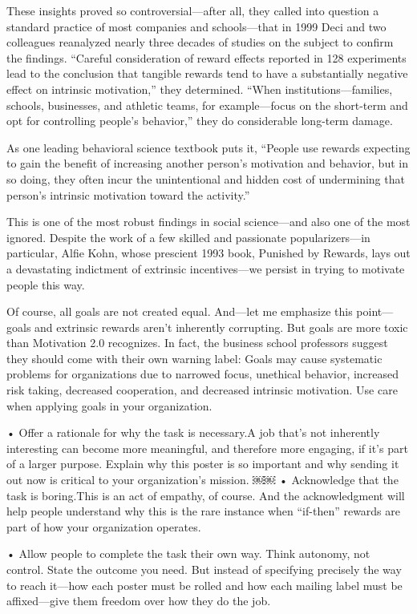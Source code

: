 These insights proved so controversial—after all, they called into question a standard practice of most companies and schools—that in 1999 Deci and two colleagues reanalyzed nearly three decades of studies on the subject to confirm the findings. “Careful consideration of reward effects reported in 128 experiments lead to the conclusion that tangible rewards tend to have a substantially negative effect on intrinsic motivation,” they determined. “When institutions—families, schools, businesses, and athletic teams, for example—focus on the short-term and opt for controlling people’s behavior,” they do considerable long-term damage.

As one leading behavioral science textbook puts it, “People use rewards expecting to gain the benefit of increasing another person’s motivation and behavior, but in so doing, they often incur the unintentional and hidden cost of undermining that person’s intrinsic motivation toward the activity.”

This is one of the most robust findings in social science—and also one of the most ignored. Despite the work of a few skilled and passionate popularizers—in particular, Alfie Kohn, whose prescient 1993 book, Punished by Rewards, lays out a devastating indictment of extrinsic incentives—we persist in trying to motivate people this way.

Of course, all goals are not created equal. And—let me emphasize this point—goals and extrinsic rewards aren’t inherently corrupting. But goals are more toxic than Motivation 2.0 recognizes. In fact, the business school professors suggest they should come with their own warning label: Goals may cause systematic problems for organizations due to narrowed focus, unethical behavior, increased risk taking, decreased cooperation, and decreased intrinsic motivation. Use care when applying goals in your organization.

• Offer a rationale for why the task is necessary.A job that’s not inherently interesting can become more meaningful, and therefore more engaging, if it’s part of a larger purpose. Explain why this poster is so important and why sending it out now is critical to your organization’s mission.
￼￼
• Acknowledge that the task is boring.This is an act of empathy, of course. And the acknowledgment will help people understand why this is the rare instance when “if-then” rewards are part of how your organization operates.

• Allow people to complete the task their own way. Think autonomy, not control. State the outcome you need. But instead of specifying precisely the way to reach it—how each poster must be rolled and how each mailing label must be affixed—give them freedom over how they do the job.

